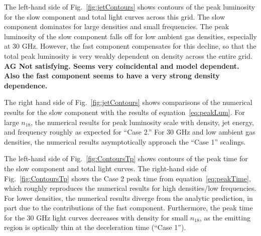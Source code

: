 \documentclass[usenatbib,fleqn]{mnras}
\begin{document}
The left-hand side of Fig.~\ref{fig:jetContours} shows contours of the
peak luminosity for the slow component and total light curves across
this grid. The slow component dominates for large
densities and small frequencies.  The peak luminosity of the slow
component falls off for low ambient gas densities, especially at 30
GHz. However, the fast component compensates for this decline, so that
the total peak luminosity is very weakly dependent on density across
the entire grid. {\bf AG Not satisfying. Seems very coincidental and
  model dependent. Also the fast component seems to have a very strong
density dependence.}

The right hand side of Fig.~\ref{fig:jetContours} shows comparisons of
the numerical results for the slow component with the results of
equation~\eqref{eq:peakLum}. For large $n_{18}$, the numerical results for
peak luminosity scale with density, jet energy, and frequency roughly
as expected for ``Case 2.'' For 30 GHz and low ambient gas densities,
the numerical results asymptotically approach the ``Case 1'' scalings.

The left-hand side of Fig.~\ref{fig:ContoursTp} shows contours of the
peak time for the slow component and total light curves. The
right-hand side of Fig.~\ref{fig:ContoursTp} shows the Case 2 peak
time from equation~\eqref{eq:peakTime}, which roughly reproduces the
numerical results for high densities/low frequencies. For lower
densities, the numerical results diverge from the analytic prediction,
in part due to the contributions of the fast component.  Furthermore,
the peak time for the 30 GHz light curves decreases with density for
small $n_{18}$, as the emitting region is optically thin at the
deceleration time (``Case 1'').
\end{document}

